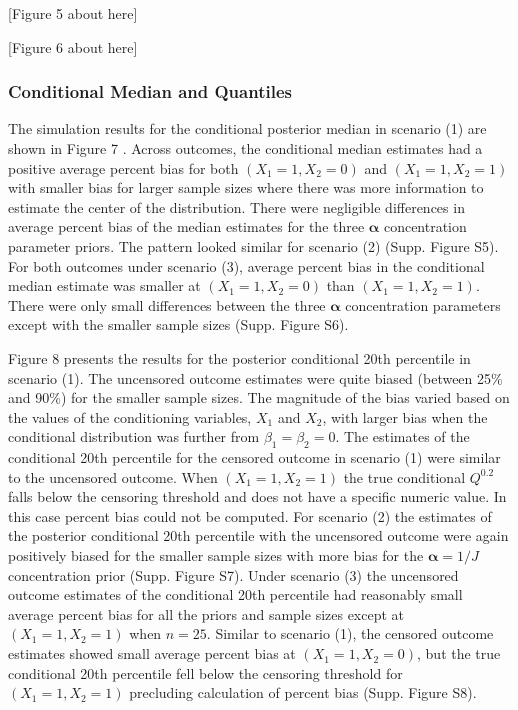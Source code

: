 \documentclass[
]{article}
\begin{document}
{[}Figure 5 about here{]}

{[}Figure 6 about here{]}

\hypertarget{conditional-median-and-quantiles}{%
\subsubsection{Conditional Median and Quantiles}\label{conditional-median-and-quantiles}}

The simulation results for the conditional posterior median in scenario (1) are shown in Figure 7 . Across outcomes, the conditional median estimates had a positive average percent bias for both \((X_1=1,X_2=0)\) and \((X_1=1,X_2=1)\) with smaller bias for larger sample sizes where there was more information to estimate the center of the distribution. There were negligible differences in average percent bias of the median estimates for the three \(\boldsymbol{\alpha}\) concentration parameter priors. The pattern looked similar for scenario (2) (Supp. Figure S5). For both outcomes under scenario (3), average percent bias in the conditional median estimate was smaller at \((X_1=1,X_2=0)\) than \((X_1=1,X_2=1)\). There were only small differences between the three \(\boldsymbol{\alpha}\) concentration parameters except with the smaller sample sizes (Supp. Figure S6).

Figure 8 presents the results for the posterior conditional 20th percentile in scenario (1). The uncensored outcome estimates were quite biased (between 25\% and 90\%) for the smaller sample sizes. The magnitude of the bias varied based on the values of the conditioning variables, \(X_1\) and \(X_2\), with larger bias when the conditional distribution was further from \(\beta_1 = \beta_2 = 0\). The estimates of the conditional 20th percentile for the censored outcome in scenario (1) were similar to the uncensored outcome. When \((X_1=1,X_2=1)\) the true conditional \(Q^{0.2}\) falls below the censoring threshold and does not have a specific numeric value. In this case percent bias could not be computed. For scenario (2) the estimates of the posterior conditional 20th percentile with the uncensored outcome were again positively biased for the smaller sample sizes with more bias for the \(\boldsymbol{\alpha}=1/J\) concentration prior (Supp. Figure S7). Under scenario (3) the uncensored outcome estimates of the conditional 20th percentile had reasonably small average percent bias for all the priors and sample sizes except at \((X_1=1,X_2=1)\) when \(n=25\). Similar to scenario (1), the censored outcome estimates showed small average percent bias at \((X_1=1,X_2=0)\), but the true conditional 20th percentile fell below the censoring threshold for \((X_1=1,X_2=1)\) precluding calculation of percent bias (Supp. Figure S8).
\end{document}
